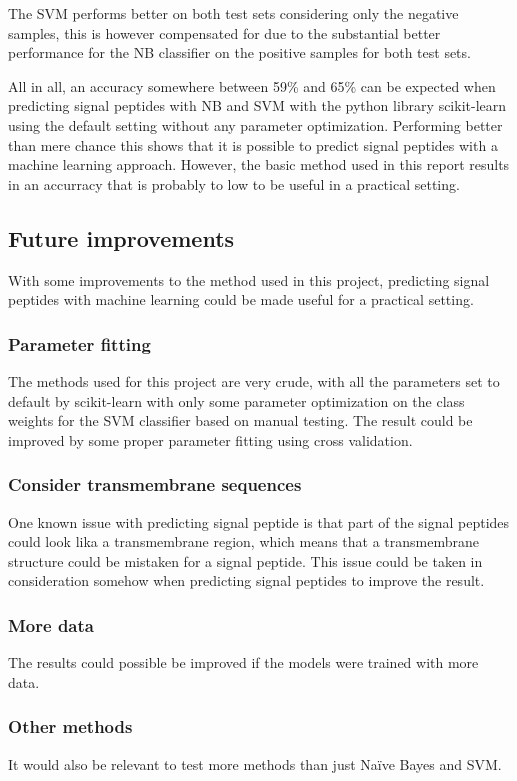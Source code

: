\documentclass[10pt]{article}
\begin{document}
The SVM performs better on both test sets considering only the negative samples, this is however compensated for due to the substantial better performance for the NB classifier on the positive samples for both test sets.

All in all, an accuracy somewhere between 59\% and 65\% can be expected when predicting signal peptides with NB and SVM with the python library scikit-learn using the default setting without any parameter optimization.
Performing better than mere chance this shows that it is possible to predict signal peptides with a machine learning approach.
However, the basic method used in this report results in an accurracy that is probably to low to be useful in a practical setting.

\subsection{Future improvements}
With some improvements to the method used in this project, predicting signal peptides with machine learning could be made useful for a practical setting.
\subsubsection{Parameter fitting}
The methods used for this project are very crude, with all the parameters set to default
by scikit-learn with only some parameter optimization on the class weights for the SVM classifier
based on manual testing. The result could be improved by some proper parameter fitting using
cross validation.
\subsubsection{Consider transmembrane sequences}
One known issue with predicting signal peptide is that part of the signal peptides could look lika a transmembrane region, which means that a transmembrane structure could be mistaken for a signal peptide\cite{website:project-description}.
This issue could be taken in consideration somehow when predicting signal peptides to improve the result.
\subsubsection{More data}
The results could possible be improved if the models were trained with more data.
\subsubsection{Other methods}
It would also be relevant to test more methods than just Naïve Bayes and SVM.
\end{document}
